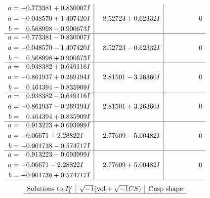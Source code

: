\documentclass[1p]{elsarticle_modified}
\theoremstyle{definition}
\newcommand{\I}{\sqrt{-1}}
\begin{document}
$$\begin{array}{c|c|c}
\begin{aligned}
u &= -0.773381 + 0.830007 I \\
a &= -0.048570 + 1.407420 I \\
b &= \phantom{-}0.568998 - 0.900673 I\end{aligned}
 & \phantom{-}8.52723 + 0.62332 I & \phantom{-0.000000 } 0 \\ \hline\begin{aligned}
u &= -0.773381 - 0.830007 I \\
a &= -0.048570 - 1.407420 I \\
b &= \phantom{-}0.568998 + 0.900673 I\end{aligned}
 & \phantom{-}8.52723 - 0.62332 I & \phantom{-0.000000 } 0 \\ \hline\begin{aligned}
u &= \phantom{-}0.938382 + 0.649116 I \\
a &= -0.861937 + 0.269194 I \\
b &= \phantom{-}0.464394 - 0.835909 I\end{aligned}
 & \phantom{-}2.81501 - 3.26360 I & \phantom{-0.000000 } 0 \\ \hline\begin{aligned}
u &= \phantom{-}0.938382 - 0.649116 I \\
a &= -0.861937 - 0.269194 I \\
b &= \phantom{-}0.464394 + 0.835909 I\end{aligned}
 & \phantom{-}2.81501 + 3.26360 I & \phantom{-0.000000 } 0 \\ \hline\begin{aligned}
u &= \phantom{-}0.913223 + 0.693999 I \\
a &= -0.06671 + 2.28822 I \\
b &= -0.901738 - 0.574717 I\end{aligned}
 & \phantom{-}2.77609 - 5.00482 I & \phantom{-0.000000 } 0 \\ \hline\begin{aligned}
u &= \phantom{-}0.913223 - 0.693999 I \\
a &= -0.06671 - 2.28822 I \\
b &= -0.901738 + 0.574717 I\end{aligned}
 & \phantom{-}2.77609 + 5.00482 I & \phantom{-0.000000 } 0\\
 \hline 
 \end{array}$$\newpage$$\begin{array}{c|c|c}  
\text{Solutions to }I^u_{1}& \I (\text{vol} + \sqrt{-1}CS) & \text{Cusp shape}\\
 \hline 

\end{array}$$
\end{document}

